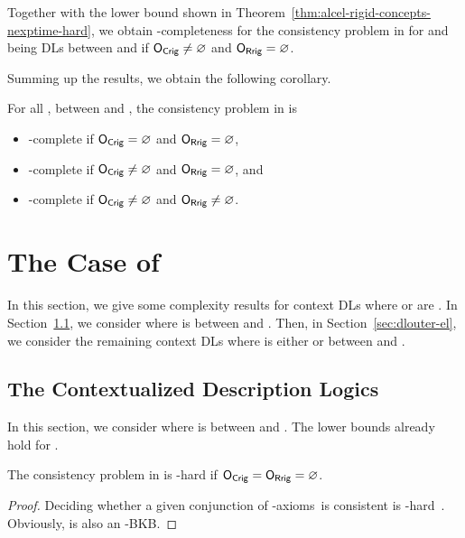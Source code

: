 
Together with the lower bound shown in Theorem~\ref{thm:alcel-rigid-concepts-nexptime-hard}, we
obtain \NExpTime-complete\-ness for the consistency problem in \LMLO for \LM and \LO being DLs between
\ALC and \SHOIQ if $\mathsf{O_{Crig}} \neq \varnothing$ and $\mathsf{O_{Rrig}} = \varnothing$.

Summing up the results, we obtain the following corollary.

\begin{corollary}
  For all \LM, \LO between \ALC and \SHOQ, the consistency problem in \LMLO is
  \begin{itemize}
  \item \ExpTime-complete if $\mathsf{O_{Crig}}=\varnothing$ and $\mathsf{O_{Rrig}}=\varnothing$,
  \item \NExpTime-complete if $\mathsf{O_{Crig}}\ne\varnothing$ and $\mathsf{O_{Rrig}}=\varnothing$, and
  \item \TwoExpTime-complete if $\mathsf{O_{Crig}}\ne\varnothing$ and $\mathsf{O_{Rrig}}\ne\varnothing$.
  \end{itemize}
\end{corollary}

\section{The Case of \texorpdfstring{\EL}{EL}}
\label{sec:case-el} 

In this section, we give some complexity results for context DLs
\LMLO where \LM or \LO are \EL.
%
In Section~\ref{sec:dlinner-el}, we consider \LMEL where \LM
is between \ALC and \SHOQ.  Then, in Section~\ref{sec:dlouter-el}, we consider
the remaining context DLs \ELLO where \LO is either \EL {}or
between \ALC and \SHOQ.

\subsection{The Contextualized Description Logics \texorpdfstring{\LMEL}{LM[EL]}}
\label{sec:dlinner-el}

In this section, we consider \LMEL where \LM is between \ALC
and \SHOQ.
%
The lower bounds already hold for \ALCEL.

\begin{theorem}\label{thm:alcel-lower-no-rigid}
  The consistency problem in \ALCEL is \ExpTime-hard if $\mathsf{O_{Crig}} = \mathsf{O_{Rrig}} = \varnothing$.
\end{theorem}

\begin{proof}
    Deciding whether a given conjunction of \ALC-axioms~\B is consistent is
    \ExpTime-hard~\cite{Sch-IJCAI91}.  Obviously, \B is also an \ALCEL-BKB.
\end{proof}

